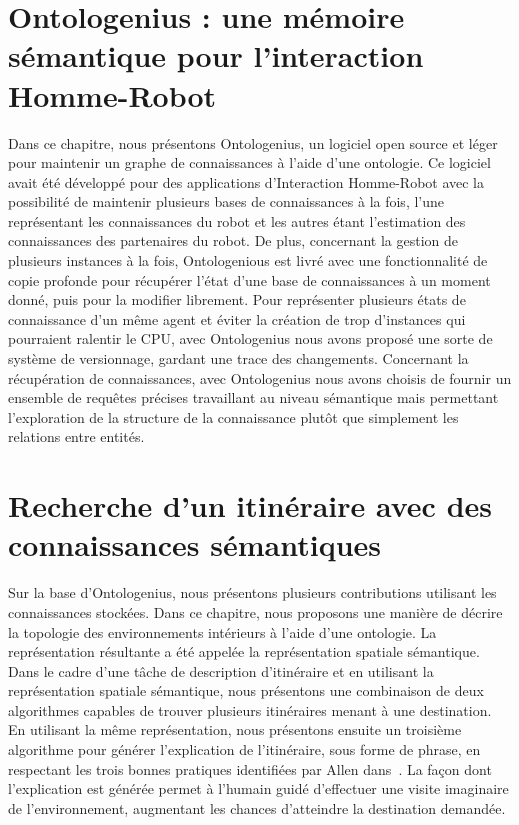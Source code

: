 \section*{Ontologenius : une mémoire sémantique pour l'interaction Homme-Robot}

Dans ce chapitre, nous présentons Ontologenius, un logiciel open source et léger pour maintenir un graphe de connaissances à l'aide d'une ontologie. Ce logiciel avait été développé pour des applications d'Interaction Homme-Robot avec la possibilité de maintenir plusieurs bases de connaissances à la fois, l'une représentant les connaissances du robot et les autres étant l'estimation des connaissances des partenaires du robot. De plus, concernant la gestion de plusieurs instances à la fois, Ontologenious est livré avec une fonctionnalité de copie profonde pour récupérer l'état d'une base de connaissances à un moment donné, puis pour la modifier librement. Pour représenter plusieurs états de connaissance d'un même agent et éviter la création de trop d'instances qui pourraient ralentir le CPU, avec Ontologenius nous avons proposé une sorte de système de versionnage, gardant une trace des changements. Concernant la récupération de connaissances, avec Ontologenius nous avons choisis de fournir un ensemble de requêtes précises travaillant au niveau sémantique mais permettant l'exploration de la structure de la connaissance plutôt que simplement les relations entre entités.

\section*{Recherche d'un itinéraire avec des connaissances sémantiques}

Sur la base d'Ontologenius, nous présentons plusieurs contributions utilisant les connaissances stockées. Dans ce chapitre, nous proposons une manière de décrire la topologie des environnements intérieurs à l'aide d'une ontologie. La représentation résultante a été appelée la représentation spatiale sémantique. Dans le cadre d'une tâche de description d'itinéraire et en utilisant la représentation spatiale sémantique, nous présentons une combinaison de deux algorithmes capables de trouver plusieurs itinéraires menant à une destination. En utilisant la même représentation, nous présentons ensuite un troisième algorithme pour générer l'explication de l'itinéraire, sous forme de phrase, en respectant les trois bonnes pratiques identifiées par Allen dans~\cite{allen_2000_principles}. La façon dont l'explication est générée permet à l'humain guidé d'effectuer une visite imaginaire de l'environnement, augmentant les chances d'atteindre la destination demandée.

